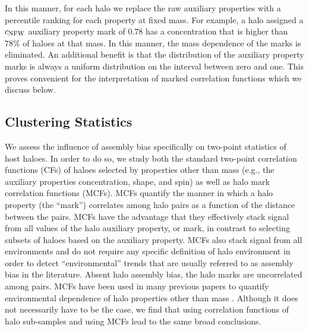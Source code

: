 \documentclass[usenatbib,fleqn]{mnras}
\begin{document}
In this manner, for each halo we replace the raw auxiliary properties with a percentile ranking for each property at fixed mass. For example, a halo assigned a $c_{\rm NFW}$ auxiliary property mark of $0.78$ has a concentration that is higher than $78\%$ of haloes at that mass. In this manner, the mass dependence of the marks is eliminated. An additional benefit is that the distribution of the auxiliary property marks is always a uniform distribution on the interval between zero and one. This proves convenient for the interpretation of marked correlation functions which we discuss below.

\subsection{Clustering Statistics}
\label{subsection:clusteringstatistics}


We assess the influence of assembly bias specifically on two-point statistics of host haloes. In order to do so, we study both the standard two-point correlation functions (CFs) of haloes selected by properties other than mass (e.g., the auxiliary properties concentration, shape, and spin) as well as halo mark correlation functions (MCFs). MCFs quantify the manner in which a halo property (the ``mark'') correlates among halo pairs as a function of the distance between the pairs. MCFs have the advantage that they effectively stack signal from all values of the halo auxiliary property, or mark, in contrast to selecting subsets of haloes based on the auxiliary property. MCFs also stack signal from all environments and do not require any specific definition of halo environment in order to detect ``environmental'' trends that are usually referred to as assembly bias in the literature. Absent halo assembly bias, the halo marks are uncorrelated among pairs. MCFs have been used in many previous papers to quantify environmental dependence of halo properties other than mass \citep{sheth_tormen04,sheth05, skibba_etal06, harker_etal06,wechsler_etal06,mao_etal15}. Although it does not necessarily have to be the case, we find that using correlation functions of halo sub-samples and using MCFs lead to the same broad conclusions. 
\end{document}
